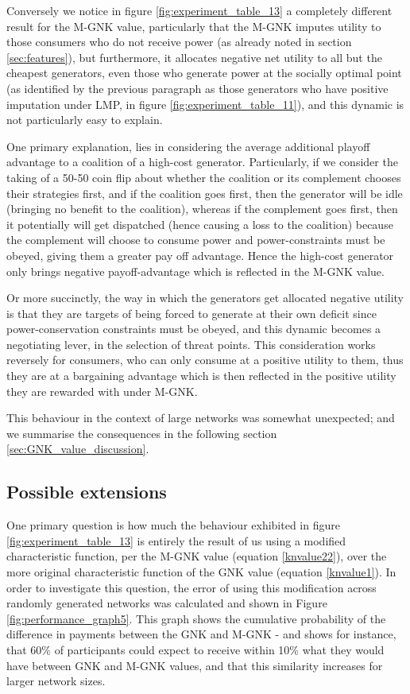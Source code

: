 Conversely we notice in figure \ref{fig:experiment_table_13} a completely different result for the M-GNK value, particularly that the M-GNK imputes utility to those consumers who do not receive power (as already noted in section \ref{sec:features}), but furthermore, it allocates negative net utility to all but the cheapest generators, even those who generate power at the socially optimal point (as identified by the previous paragraph as those generators who have positive imputation under LMP, in figure \ref{fig:experiment_table_11}), and this dynamic is not particularly easy to explain.

One primary explanation, lies in considering the average additional playoff advantage to a coalition of a high-cost generator.
Particularly, if we consider the taking of a 50-50 coin flip about whether the coalition or its complement chooses their strategies first, and if the coalition goes first, then the generator will be idle (bringing no benefit to the coalition), whereas if the complement goes first, then it potentially will get dispatched (hence causing a loss to the coalition) because the complement will choose to consume power and power-constraints must be obeyed, giving them a greater pay off advantage.
Hence the high-cost generator only brings negative payoff-advantage which is reflected in the M-GNK value.

Or more succinctly, the way in which the generators get allocated negative utility is that they are targets of being forced to generate at their own deficit since power-conservation constraints must be obeyed, and this dynamic becomes a negotiating lever, in the selection of threat points.
This consideration works reversely for consumers, who can only consume at a positive utility to them, thus they are at a bargaining advantage which is then reflected in the positive utility they are rewarded with under M-GNK.

This behaviour in the context of large networks was somewhat unexpected; and we summarise the consequences in the following section \ref{sec:GNK_value_discussion}.

\subsection{Possible extensions}\label{sec:GNK_extensions_discussion}

One primary question is how much the behaviour exhibited in figure \ref{fig:experiment_table_13} is entirely the result of us using a modified characteristic function, per the M-GNK value (equation \ref{knvalue22}), over the more original characteristic function of the GNK value (equation \ref{knvalue1}).
In order to investigate this question, the error of using this modification across randomly generated networks was calculated and shown in Figure \ref{fig:performance_graph5}.
This graph shows the cumulative probability of the difference in payments between the GNK and M-GNK - and shows for instance, that 60\% of participants could expect to receive within 10\% what they would have between GNK and M-GNK values, and that this similarity increases for larger network sizes.

